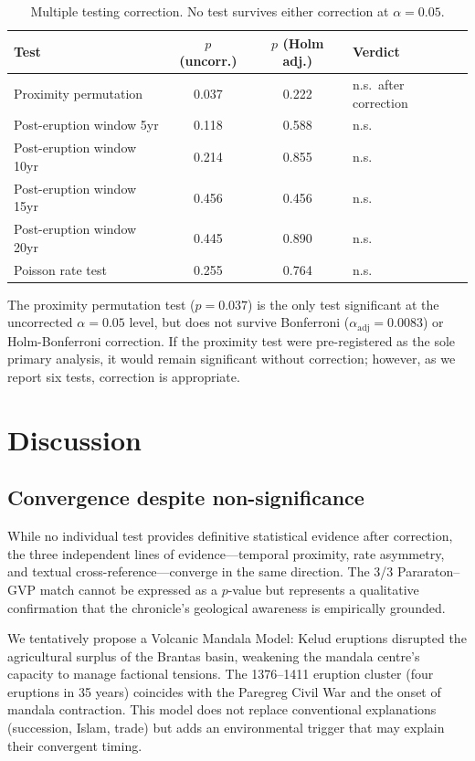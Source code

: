 \documentclass[12pt,a4paper]{article}
\begin{document}
\begin{table}[htbp]
\centering
\caption{Multiple testing correction. No test survives either correction at $\alpha = 0.05$.}
\label{tab:correction}
\begin{tabular}{lccl}
\toprule
Test & $p$ (uncorr.) & $p$ (Holm adj.) & Verdict \\
\midrule
Proximity permutation   & 0.037 & 0.222 & n.s.\ after correction \\
Post-eruption window 5yr  & 0.118 & 0.588 & n.s. \\
Post-eruption window 10yr & 0.214 & 0.855 & n.s. \\
Post-eruption window 15yr & 0.456 & 0.456 & n.s. \\
Post-eruption window 20yr & 0.445 & 0.890 & n.s. \\
Poisson rate test       & 0.255 & 0.764 & n.s. \\
\bottomrule
\end{tabular}
\end{table}

\noindent
The proximity permutation test ($p = 0.037$) is the only test significant at the uncorrected $\alpha = 0.05$ level, but does not survive Bonferroni ($\alpha_\mathrm{adj} = 0.0083$) or Holm-Bonferroni correction.
If the proximity test were pre-registered as the sole primary analysis, it would remain significant without correction; however, as we report six tests, correction is appropriate.

\section{Discussion}

\subsection{Convergence despite non-significance}

While no individual test provides definitive statistical evidence after correction, the three independent lines of evidence---temporal proximity, rate asymmetry, and textual cross-reference---converge in the same direction.
The 3/3 Pararaton--GVP match cannot be expressed as a $p$-value but represents a qualitative confirmation that the chronicle's geological awareness is empirically grounded.

We tentatively propose a Volcanic Mandala Model: Kelud eruptions disrupted the agricultural surplus of the Brantas basin, weakening the mandala centre's capacity to manage factional tensions.
The 1376--1411 eruption cluster (four eruptions in 35 years) coincides with the Paregreg Civil War and the onset of mandala contraction.
This model does not replace conventional explanations (succession, Islam, trade) but adds an environmental trigger that may explain their convergent timing.
\end{document}

